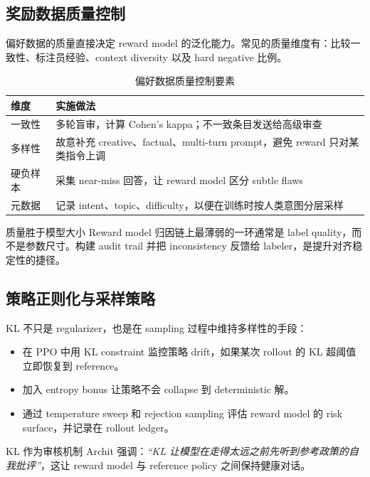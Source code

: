 \documentclass[a4paper]{article}
\begin{document}
\subsection{奖励数据质量控制}

偏好数据的质量直接决定 reward model 的泛化能力。常见的质量维度有：比较一致性、标注员经验、context diversity 以及 hard negative 比例。

\begin{table}[H]
\centering
\begin{tabular}{p{} p{}}
\toprule
维度 & 实施做法 \\
\midrule
一致性 & 多轮盲审，计算 Cohen's kappa；不一致条目发送给高级审查 \\
多样性 & 故意补充 creative、factual、multi-turn prompt，避免 reward 只对某类指令上调 \\
硬负样本 & 采集 near-miss 回答，让 reward model 区分 subtle flaws \\
元数据 & 记录 intent、topic、difficulty，以便在训练时按人类意图分层采样 \\
\bottomrule
\end{tabular}
\caption{偏好数据质量控制要素}
\end{table}

\begin{knowledgebox}{质量胜于模型大小}
Reward model 归因链上最薄弱的一环通常是 label quality，而不是参数尺寸。构建 audit trail 并把 inconsistency 反馈给 labeler，是提升对齐稳定性的捷径。
\end{knowledgebox}

\subsection{策略正则化与采样策略}

KL 不只是 regularizer，也是在 sampling 过程中维持多样性的手段：
\begin{itemize}
    \item 在 PPO 中用 KL constraint 监控策略 drift，如果某次 rollout 的 KL 超阈值立即恢复到 reference。
    \item 加入 entropy bonus 让策略不会 collapse 到 deterministic 解。
    \item 通过 temperature sweep 和 rejection sampling 评估 reward model 的 risk surface，并记录在 rollout ledger。
\end{itemize}

\begin{importantbox}{KL 作为审核机制}
Archit 强调：\textit{``KL 让模型在走得太远之前先听到参考政策的自我批评''}，这让 reward model 与 reference policy 之间保持健康对话。
\end{importantbox}
\end{document}
